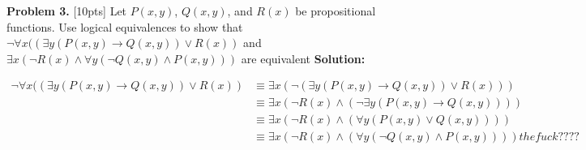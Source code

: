 \documentclass[10pt]{article}
\renewcommand{\implies}{\rightarrow}
\renewcommand{\lor}{\vee}
\renewcommand{\land}{\wedge}
\begin{document}
\clearpage
\textbf{Problem 3.} [10pts] Let $P(x,y)$, $Q(x,y)$, and $R(x)$ be propositional functions. Use logical equivalences to show that $\lnot \forall x((\exists y(P(x,y) \implies Q(x,y)) \lor R(x))$ and $\exists x(\lnot R(x) \land \forall y(\lnot Q(x,y) \land P(x,y)))$ are equivalent
\textbf{Solution:}
\begin{center}
  \begin{align*}
    \lnot \forall x((\exists y(P(x,y) \implies Q(x,y)) \lor R(x)) &\equiv \exists x(\lnot(\exists y(P(x,y) \implies Q(x,y)) \lor R(x)))\\
    &\equiv \exists x (\lnot R(x) \land (\lnot \exists y (P(x,y) \implies Q(x,y))))\\
    &\equiv \exists x (\lnot R(x) \land (\forall y (P(x,y) \lor
    Q(x,y))))\\
    &\equiv \exists x (\lnot R(x) \land (\forall y (\lnot Q(x,y) \land P(x,y))))
    the fuck ????
  \end{align*}
\end{center}
\end{document}
